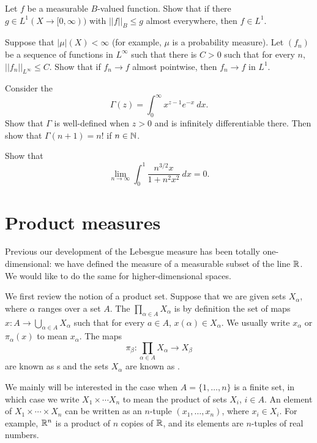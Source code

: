 \begin{exercise}
Let $f$ be a measurable $B$-valued function. Show that if there $g \in L^1(X \to [0, \infty))$ with $||f||_B \leq g$ almost everywhere, then $f \in L^1$.
\end{exercise}

\begin{exercise}
Suppose that $|\mu|(X) < \infty$ (for example, $\mu$ is a probability measure). Let $(f_n)$ be a sequence of functions in $L^\infty$ such that there is $C > 0$ such that for every $n$, $||f_n||_{L^\infty} \leq C$.
Show that if $f_n \to f$ almost pointwise, then $f_n \to f$ in $L^1$.
\end{exercise}

\begin{exercise}
Consider the 
$$\Gamma(z) = \int_0^\infty x^{z - 1} e^{-x} ~dx.$$
Show that $\Gamma$ is well-defined when $z > 0$ and is infinitely differentiable there. Then show that $\Gamma(n + 1) = n!$ if $n \in \mathbb{N}$.
\end{exercise}

\begin{exercise}
Show that
$$\lim_{n \to \infty} \int_0^1 \frac{n^{3/2}x}{1 + n^2x^2} ~dx = 0.$$
\end{exercise}

\section{Product measures}
Previous our development of the Lebesgue measure has been totally one-dimensional: we have defined the measure of a measurable subset of the line $\mathbb{R}$.
We would like to do the same for higher-dimensional spaces.

We first review the notion of a product set. Suppose that we are given sets $X_\alpha$, where $\alpha$ ranges over a set $A$.
The  $\prod_{\alpha \in A} X_\alpha$ is by definition the set of maps $x: A \to \bigcup_{\alpha \in A} X_\alpha$ such that for every $a \in A$, $x(\alpha) \in X_\alpha$.
We usually write $x_\alpha$ or $\pi_\alpha(x)$ to mean $x_\alpha$. The maps
$$\pi_\beta: \prod_{\alpha \in A} X_\alpha \to X_\beta$$
are known as s and the sets $X_\alpha$ are known as .

We mainly will be interested in the case when $A = \{1, \dots, n\}$ is a finite set, in which case we write $X_1 \times \cdots X_n$ to mean the product of sets $X_i$, $i \in A$.
An element of $X_1 \times \cdots \times X_n$ can be written as an $n$-tuple $(x_1, \dots, x_n)$, where $x_i \in X_i$.
For example, $\mathbb{R}^n$ is a product of $n$ copies of $\mathbb{R}$, and its elements are $n$-tuples of real numbers.

